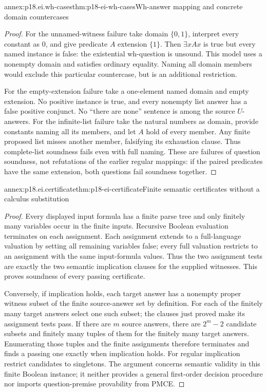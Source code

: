 \begin{annexitem}{annex:p18.ei.wh-cases}{thm:p18-ei-wh-cases}{Wh-answer mapping and concrete domain countercases}
\begin{proof}
For the unnamed-witness failure take domain \(\{0,1\}\), interpret every
constant as 0, and give predicate \(A\) extension \(\{1\}\). Then
\(\exists xAx\) is true but every named instance is false: the existential
wh-question is unsound. This model uses a nonempty domain and satisfies
ordinary equality. Naming all domain members would exclude this particular
countercase, but is an additional restriction.

For the empty-extension failure take a one-element named domain and empty
extension. No positive instance is true, and every nonempty list answer has
a false positive conjunct. No ``there are none'' sentence is among the source
\(U\)-answers. For the infinite-list failure take the natural numbers as
domain, provide constants naming all its members, and let \(A\) hold of
every member. Any finite proposed list misses another member, falsifying its
exhaustion clause. Thus complete-list soundness fails even with full naming.
These are failures of question soundness, not refutations of the earlier
regular mappings: if the paired predicates have the same extension, both
questions fail soundness together.
\end{proof}
\end{annexitem}

\begin{annexitem}{annex:p18.ei.certificate}{thm:p18-ei-certificate}{Finite semantic certificates without a calculus substitution}
\begin{proof}
Every displayed input formula has a finite parse tree and only finitely many
variables occur in the finite inputs. Recursive Boolean evaluation terminates
on each assignment. Each assignment extends to a full-language valuation by
setting all remaining variables false; every full valuation restricts to an
assignment with the same input-formula values. Thus the two assignment tests
are exactly the two semantic implication clauses for the supplied witnesses.
This proves soundness of every passing certificate.

Conversely, if implication holds, each target answer has a nonempty proper
witness subset of the finite source-answer set by definition. For each of
the finitely many target answers select one such subset; the clauses just
proved make its assignment tests pass. If there are \(m\) source answers,
there are \(2^m-2\) candidate subsets and finitely many tuples of them for
the finitely many target answers. Enumerating those tuples and the finite
assignments therefore terminates and finds a passing one exactly when
implication holds. For regular implication restrict candidates to singletons.
The argument concerns semantic validity in this finite Boolean instance;
it neither provides a general first-order decision procedure nor imports
question-premise provability from PMCE.
\end{proof}
\end{annexitem}
